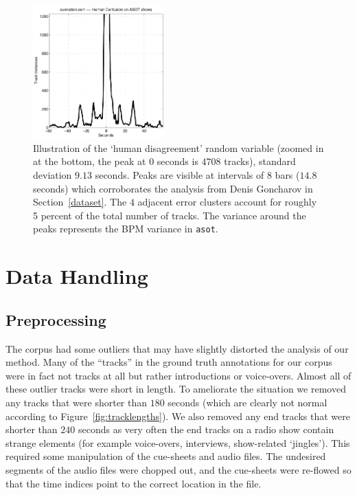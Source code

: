 \documentclass[twocolumn]{article}
\begin{document}
	\begin{figure}
		\centering
		\includegraphics[width=0.45\textwidth]{images/human_confusion}
		
		\caption{Illustration of the `human disagreement' random variable (zoomed in at the bottom, the peak at $0$ seconds is $4708$ tracks), standard deviation $9.13$ seconds. Peaks are visible at intervals of $8$ bars ($14.8$ seconds) which corroborates the analysis from Denis Goncharov in Section~\ref{dataset}. The $4$ adjacent error clusters account for roughly 5 percent of the total number of tracks. The variance around the peaks represents the BPM variance in \texttt{asot}. }
		\label{fig:human_muchconfuse}
	\end{figure} 
	
	\section{Data Handling}\label{sec:data-handling}
	
	\subsection{Preprocessing}\label{proprocessing} %
	
	The corpus had some outliers that may have slightly distorted the analysis of our method. Many of the ``tracks'' in the ground truth annotations for our corpus were in fact not tracks at all but rather introductions or voice-overs. Almost all of these outlier tracks were short in length. To ameliorate the situation we removed any tracks that were shorter than $180$ seconds (which are clearly not normal according to Figure~\ref{fig:tracklengths}). We also removed any end tracks that were shorter than $240$ seconds as very often the end tracks on a radio show contain strange elements (for example voice-overs, interviews, show-related `jingles'). This required some manipulation of the cue-sheets and audio files. The undesired segments of the audio files were chopped out, and the cue-sheets were re-flowed so that the time indices point to the correct location in the file. 
	
\end{document}
